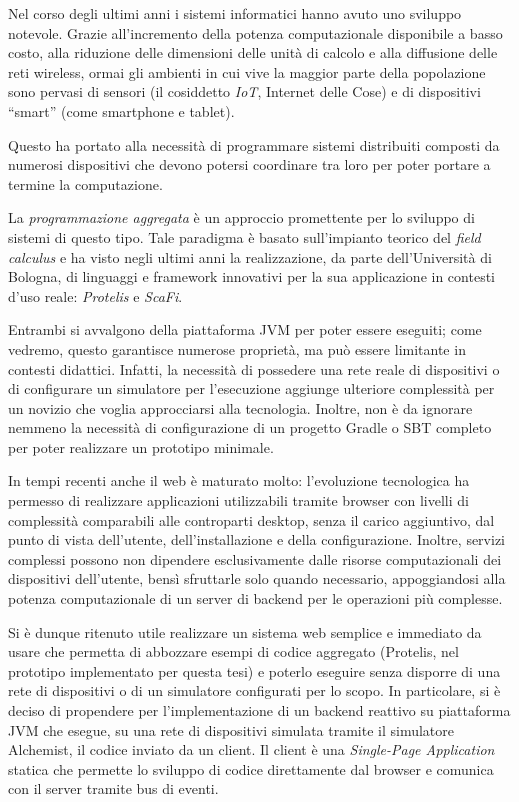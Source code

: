 \label{ch:intro}

Nel corso degli ultimi anni i sistemi informatici hanno avuto uno sviluppo notevole.
Grazie all'incremento della potenza computazionale disponibile a basso costo, alla riduzione delle dimensioni delle unità di calcolo e alla diffusione delle reti wireless,
ormai gli ambienti in cui vive la maggior parte della popolazione sono pervasi di sensori (il cosiddetto \emph{IoT}, Internet delle Cose) e di dispositivi ``smart'' (come smartphone e tablet).

Questo ha portato alla necessità di programmare sistemi distribuiti composti da numerosi dispositivi che devono potersi coordinare tra loro
per poter portare a termine la computazione.

La \emph{programmazione aggregata} è un approccio promettente per lo sviluppo di sistemi di questo tipo.
Tale paradigma è basato sull'impianto teorico del \emph{field calculus} e ha visto negli ultimi anni la realizzazione,
da parte dell'Università di Bologna, di linguaggi e framework innovativi per la sua applicazione in contesti d'uso reale:
\emph{Protelis} e \emph{ScaFi}.

Entrambi si avvalgono della piattaforma JVM per poter essere eseguiti;
come vedremo, questo garantisce numerose proprietà, ma può essere limitante in contesti didattici.
Infatti, la necessità di possedere una rete reale di dispositivi o di configurare un simulatore per l'esecuzione
aggiunge ulteriore complessità per un novizio che voglia approcciarsi alla tecnologia.
Inoltre, non è da ignorare nemmeno la necessità di configurazione di un progetto Gradle o SBT completo per poter realizzare un prototipo minimale.

In tempi recenti anche il web è maturato molto:
l'evoluzione tecnologica ha permesso di realizzare applicazioni utilizzabili tramite browser con livelli di complessità comparabili alle controparti desktop,
senza il carico aggiuntivo, dal punto di vista dell'utente, dell'installazione e della configurazione.
Inoltre, servizi complessi possono non dipendere esclusivamente dalle risorse computazionali dei dispositivi dell'utente,
bensì sfruttarle solo quando necessario, appoggiandosi alla potenza computazionale di un server di backend per le operazioni più complesse.

Si è dunque ritenuto utile realizzare un sistema web semplice e immediato da usare che permetta di abbozzare esempi di codice aggregato
(Protelis, nel prototipo implementato per questa tesi) e poterlo eseguire senza disporre di una rete di dispositivi o di un simulatore configurati per lo scopo.
In particolare, si è deciso di propendere per l'implementazione di un backend reattivo su piattaforma JVM che esegue, su una rete di dispositivi simulata tramite il simulatore Alchemist, il codice inviato da un client.
Il client è una \emph{Single-Page Application} statica che permette lo sviluppo di codice direttamente dal browser e comunica con il server tramite bus di eventi.

